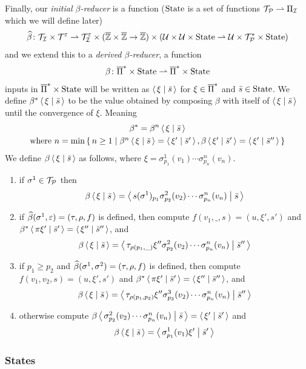 \documentclass{llncs}
\begin{document}
Finally, our \textit{initial $\beta$-reducer} is a function ($\mathrm{State}$ is a set of functions $\mathcal T_{\mathcal P}\rightharpoonup\Pi_{\mathcal I}$ which we will define later)
\[ \widehat\beta\colon\mathcal T_{\mathcal I}\times\mathcal T^\varepsilon \rightharpoonup \mathcal T_{\mathcal I}^\varepsilon\times(\overline{\mathbb Z}\times\overline{\mathbb Z}\to\overline{\mathbb Z})\times(\mathcal U\times\mathcal U\times\mathrm{State}\rightharpoonup\mathcal U\times\mathcal T_{\mathcal P}^*\times\mathrm{State}) \]
and we extend this to a \textit{derived $\beta$-reducer}, a function
\[ \beta\colon\overline{\Pi}^*\times\mathrm{State} \rightharpoonup \overline{\Pi}^*\times\mathrm{State} \]
inputs in $\overline{\Pi}^*\times\mathrm{State}$ will be written as $\gen\xi[\bar s]$ for $\xi\in\overline{\Pi}^*$ and $\bar s\in\mathrm{State}$.
We define $\beta^*\gen\xi[\bar s]$ to be the value obtained by composing $\beta$ with itself of $\gen\xi[\bar s]$ until the convergence of $\xi$.
Meaning
\begin{multline*}
    \beta^* = \beta^n\gen\xi[\bar s]\\
    \hbox{where $n=\min\set{n\geq1}[{\beta^n\gen\xi[\bar s]=\gen{\xi'}[\bar s'],\beta\gen{\xi'}[\bar s']=\gen{\xi'}[\bar s'']}]$}
\end{multline*}
We define $\beta\gen\xi[\bar s]$ as follows, where $\xi=\sigma^1_{p_1}(v_1)\cdots\sigma^n_{p_n}(v_n)$.
\begin{enumerate}
    \item if $\sigma^1\in\mathcal T_{\mathcal P}$ then
    \[ \beta\gen\xi[\bar s] = \gen{s(\sigma^1)_{p_1}\sigma^2_{p_2}(v_2)\cdots\sigma^n_{p_n}(v_n)}[\bar s] \]
    \item if $\widehat\beta(\sigma^1,\varepsilon)=(\tau,\rho,f)$ is defined, then compute $f(v_1,\_,s)=(u,\xi',s')$ and $\beta^*\gen{\pi\xi'}[\bar s']=\gen{\xi''}[\bar s'']$, and
    \[ \beta\gen\xi[\bar s] = \gen{\tau_{\rho(p_1,\_)}\xi''\sigma^2_{p_2}(v_2)\cdots\sigma^n_{p_n}(v_n)}[\bar s''] \]
    \item if $p_1\geq p_2$ and $\widehat\beta(\sigma^1,\sigma^2)=(\tau,\rho,f)$ is defined, then compute $f(v_1,v_2,s)=(u,\xi',s')$ and $\beta^*\gen{\pi\xi'}[\bar s']=\gen{\xi''}[\bar s'']$, and
    \[ \beta\gen\xi[\bar s] = \gen{\tau_{\rho(p_1,p_2)}\xi''\sigma^3_{p_3}(v_2)\cdots\sigma^n_{p_n}(v_n)}[\bar s''] \]
    \item otherwise compute $\beta\gen{\sigma^2_{p_2}(v_2)\cdots\sigma^n_{p_n}(v_n)}[\bar s]=\gen{\xi'}[\bar s']$ and
    \[ \beta\gen\xi[\bar s] = \gen{\sigma^1_{p_1}(v_1)\xi'}[\bar s'] \]
\end{enumerate}

\subsubsection{States}
\end{document}
